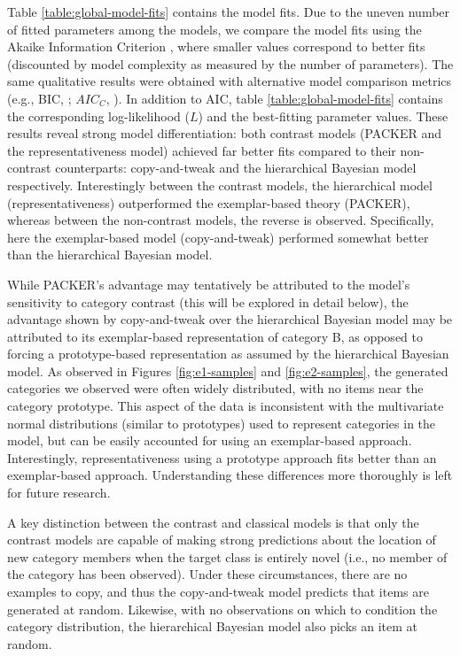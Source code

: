 \documentclass[12pt]{article}
\begin{document}
\begin{flushleft}
Table \ref{table:global-model-fits} contains the model fits. Due to the uneven number of fitted parameters among the models, we
compare the model fits using the Akaike Information Criterion
\citep[AIC;][]{akaike1974new}, where smaller values correspond to better fits
(discounted by model complexity as measured by the number of parameters). The
same qualitative results were obtained with alternative model comparison metrics
(e.g., BIC, \citealp{schwarz1978estimating}; $AIC_C$,
\citealp{hurvich1989regression}). In addition to AIC, table \ref{table:global-model-fits} contains the corresponding log-likelihood ($L$) and the best-fitting
parameter values. These results reveal strong model differentiation: both
contrast models (PACKER and the representativeness model) achieved far better
fits compared to their non-contrast counterparts: copy-and-tweak and the
hierarchical Bayesian model respectively. Interestingly between the contrast
models, the hierarchical model (representativeness) outperformed the
exemplar-based theory (PACKER), whereas between the non-contrast models, the
reverse is observed. Specifically, here the exemplar-based model
(copy-and-tweak) performed somewhat better than the hierarchical Bayesian model.

While PACKER's advantage may tentatively be attributed to the model's
sensitivity to category contrast (this will be explored in detail below), the
advantage shown by copy-and-tweak over the hierarchical Bayesian model may be
attributed to its exemplar-based representation of category B, as opposed to forcing a
prototype-based representation as assumed by the hierarchical Bayesian model. As
observed in Figures \ref{fig:e1-samples} and \ref{fig:e2-samples}, the generated
categories we observed were often widely distributed, with no items near the
category prototype. This aspect of the data is inconsistent with the
multivariate normal distributions (similar to prototypes) used to represent
categories in the \cite{jern2013probabilistic} model, but can be easily
accounted for using an exemplar-based approach. Interestingly, representativeness using a prototype approach fits better than an exemplar-based approach. Understanding these differences more thoroughly is left for future research.

A key distinction between the contrast and classical models is that only the
contrast models are capable of making strong predictions about the location of
new category members when the target class is entirely novel (i.e., no member of
the category has been observed). Under these circumstances, there are no
examples to copy, and thus the copy-and-tweak model predicts that items are
generated at random. Likewise, with no observations on which to condition the
category distribution, the hierarchical Bayesian model also picks an item at
random.


\end{flushleft}
\end{document}
